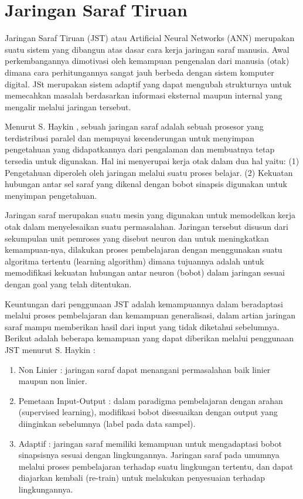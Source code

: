 \section{Jaringan Saraf Tiruan}
\label{sec:jst}

Jaringan Saraf Tiruan (JST) atau Artificial Neural Networks (ANN)
merupakan suatu sistem yang dibangun atas dasar cara kerja jaringan saraf
manusia. Awal perkembangannya dimotivasi oleh kemampuan pengenalan dari manusia
(otak) dimana cara perhitungannya sangat jauh berbeda dengan sistem komputer
digital. JSt merupakan sistem adaptif yang dapat mengubah strukturnya
untuk memecahkan masalah berdasarkan informasi eksternal maupun internal
yang mengalir melalui jaringan tersebut. 

Menurut S. Haykin \cite{haykin-1994}, sebuah jaringan saraf adalah sebuah
prosesor yang terdistribusi paralel dan mempuyai kecenderungan untuk menyimpan
pengetahuan yang didapatkannya dari pengalaman dan membuatnya tetap tersedia
untuk digunakan. Hal ini menyerupai kerja otak dalam dua hal yaitu: (1)
Pengetahuan diperoleh oleh jaringan melalui suatu proses belajar. (2) Kekuatan
hubungan antar sel saraf yang dikenal dengan bobot sinapsis digunakan untuk
menyimpan pengetahuan.

Jaringan saraf merupakan suatu mesin yang digunakan untuk memodelkan kerja otak
dalam menyelesaikan suatu permasalahan. Jaringan tersebut disusun dari
sekumpulan unit pemroses yang disebut neuron dan untuk meningkatkan
kemampuan-nya, dilakukan proses pembelajaran dengan menggunakan suatu algoritma
tertentu (learning algorithm) dimana tujuannya adalah untuk memodifikasi
kekuatan hubungan antar neuron (bobot) dalam jaringan sesuai dengan goal yang
telah ditentukan.

Keuntungan dari penggunaan JST adalah kemampuannya dalam beradaptasi melalui
proses pembelajaran dan kemampuan generalisasi, dalam artian jaringan saraf
mampu memberikan hasil dari input yang tidak diketahui sebelumnya. Berikut
adalah beberapa kemampuan yang dapat diberikan melalui penggunaan JST menurut S.
Haykin \cite{haykin-1994}:
\begin{enumerate}
  \item Non Linier : jaringan saraf dapat menangani permasalahan baik linier
  maupun non linier.
  \item Pemetaan Input-Output : dalam paradigma pembelajaran dengan arahan
  (supervised learning), modifikasi bobot disesuaikan dengan output yang
  diinginkan sebelumnya (label pada data sampel).
  \item Adaptif : jaringan saraf memiliki kemampuan untuk mengadaptasi bobot
  sinapsisnya sesuai dengan lingkungannya. Jaringan saraf pada umumnya melalui
  proses pembelajaran terhadap suatu lingkungan tertentu, dan dapat diajarkan
  kembali (re-train) untuk melakukan penyesuaian terhadap lingkungannya. 
\end{enumerate}


